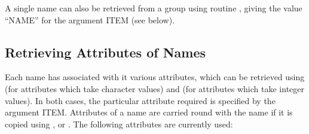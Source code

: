 A single name can also be retrieved from a group using routine ,
giving the value ``NAME'' for the argument ITEM (see below).

\subsection{Retrieving Attributes of Names}
Each name has associated with it various attributes, which can be retrieved
using  (for attributes which take character values) and 
(for attributes which take integer values). In both cases, the particular
attribute required is specified by the argument ITEM. Attributes of a name
are carried round with the name if it is copied using ,  or
. The following attributes are currently used:

